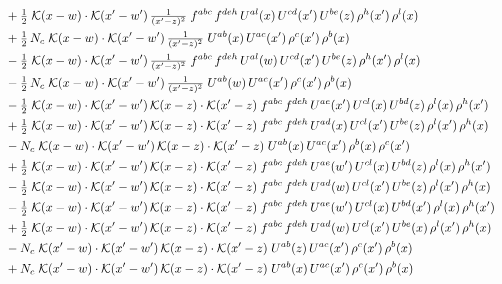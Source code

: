 \documentclass[10pt]{article}
\numberwithin{equation}{section}
\begin{document}
\begin{align}
&\quad +\tfrac{1}{2}\;\mathcal{K}(x-w)\cdot\mathcal{K}(x'-w')\,\tfrac{1}{(x'-z)^{2}}\;f^{abc}\,f^{deh}\,U^{al}(x)\,U^{cd}(x')\,U^{be}(z)\,\rho^{h}(x')\,\rho^{l}(x)\notag\\
&\quad +\tfrac{1}{2}\,N_c\;\mathcal{K}(x-w)\cdot\mathcal{K}(x'-w')\,\tfrac{1}{(x'-z)^{2}}\;U^{ab}(x)\,U^{ac}(x')\,\rho^{c}(x')\,\rho^{b}(x)\notag\\
&\quad -\tfrac{1}{2}\;\mathcal{K}(x-w)\cdot\mathcal{K}(x'-w')\,\tfrac{1}{(x'-z)^{2}}\;f^{abc}\,f^{deh}\,U^{al}(w)\,U^{cd}(x')\,U^{be}(z)\,\rho^{h}(x')\,\rho^{l}(x)\notag\\
&\quad -\tfrac{1}{2}\,N_c\;\mathcal{K}(x-w)\cdot\mathcal{K}(x'-w')\,\tfrac{1}{(x'-z)^{2}}\;U^{ab}(w)\,U^{ac}(x')\,\rho^{c}(x')\,\rho^{b}(x)\notag\\
&\quad -\tfrac{1}{2}\;\mathcal{K}(x-w)\cdot\mathcal{K}(x'-w')\,\mathcal{K}(x-z)\cdot\mathcal{K}(x'-z)\;f^{abc}\,f^{deh}\,U^{ae}(x')\,U^{cl}(x)\,U^{bd}(z)\,\rho^{l}(x)\,\rho^{h}(x')\notag\\
&\quad +\tfrac{1}{2}\;\mathcal{K}(x-w)\cdot\mathcal{K}(x'-w')\,\mathcal{K}(x-z)\cdot\mathcal{K}(x'-z)\;f^{abc}\,f^{deh}\,U^{ad}(x)\,U^{cl}(x')\,U^{be}(z)\,\rho^{l}(x')\,\rho^{h}(x)\notag\\
&\quad -N_c\;\mathcal{K}(x-w)\cdot\mathcal{K}(x'-w')\,\mathcal{K}(x-z)\cdot\mathcal{K}(x'-z)\;U^{ab}(x)\,U^{ac}(x')\,\rho^{b}(x)\,\rho^{c}(x')\notag\\
&\quad +\tfrac{1}{2}\;\mathcal{K}(x-w)\cdot\mathcal{K}(x'-w')\,\mathcal{K}(x-z)\cdot\mathcal{K}(x'-z)\;f^{abc}\,f^{deh}\,U^{ae}(w')\,U^{cl}(x)\,U^{bd}(z)\,\rho^{l}(x)\,\rho^{h}(x')\notag\\
&\quad -\tfrac{1}{2}\;\mathcal{K}(x-w)\cdot\mathcal{K}(x'-w')\,\mathcal{K}(x-z)\cdot\mathcal{K}(x'-z)\;f^{abc}\,f^{deh}\,U^{ad}(w)\,U^{cl}(x')\,U^{be}(z)\,\rho^{l}(x')\,\rho^{h}(x)\notag\\
&\quad -\tfrac{1}{2}\;\mathcal{K}(x-w)\cdot\mathcal{K}(x'-w')\,\mathcal{K}(x-z)\cdot\mathcal{K}(x'-z)\;f^{abc}\,f^{deh}\,U^{ae}(w')\,U^{cl}(x)\,U^{bd}(x')\,\rho^{l}(x)\,\rho^{h}(x')\notag\\
&\quad +\tfrac{1}{2}\;\mathcal{K}(x-w)\cdot\mathcal{K}(x'-w')\,\mathcal{K}(x-z)\cdot\mathcal{K}(x'-z)\;f^{abc}\,f^{deh}\,U^{ad}(w)\,U^{cl}(x')\,U^{be}(x)\,\rho^{l}(x')\,\rho^{h}(x)\notag\\
&\quad -N_c\;\mathcal{K}(x'-w)\cdot\mathcal{K}(x'-w')\,\mathcal{K}(x-z)\cdot\mathcal{K}(x'-z)\;U^{ab}(z)\,U^{ac}(x')\,\rho^{c}(x')\,\rho^{b}(x)\notag\\
&\quad +N_c\;\mathcal{K}(x'-w)\cdot\mathcal{K}(x'-w')\,\mathcal{K}(x-z)\cdot\mathcal{K}(x'-z)\;U^{ab}(x)\,U^{ac}(x')\,\rho^{c}(x')\,\rho^{b}(x)\notag\\

\end{align}
\end{document}
